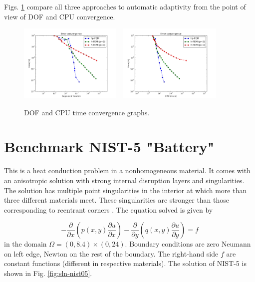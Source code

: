 \documentclass[12pt]{elsarticle}
\begin{document}
Figs. \ref{fig:nist-4-conv} compare all
three approaches to automatic adaptivity from the point
of view of DOF and CPU convergence.

\begin{figure}[H]
\centering
\vspace{-5mm}
\includegraphics[height=3.7cm]{nist/nist-4/conv_dof_aniso.png}\ \
\includegraphics[height=3.7cm]{nist/nist-4/conv_cpu_aniso.png}
\vspace{-5mm}
\caption{DOF and CPU time convergence graphs.}
\vspace{-5mm}
\label{fig:nist-4-conv}
\end{figure}


\section{Benchmark NIST-5 "Battery"}
\label{sec:bench-5}

This is a heat conduction problem in a nonhomogeneous material.
It comes with an anisotropic solution with strong internal disruption
layers and singularities.
The solution has multiple point singularities in the interior at which
more than three different materials meet. These singularities are stronger than those
corresponding to reentrant corners \cite{demkowicz-1}.
The equation solved is given by

\begin{equation} \label{heat-conduction}
-\frac{\partial }{\partial x}\left(p(x, y)\frac{\partial u}{\partial x}\right)
-\frac{\partial }{\partial y}\left(q(x, y)\frac{\partial u}{\partial y}\right) = f
\end{equation}
in the domain $\Omega = (0, 8.4) \times (0, 24)$. Boundary conditions are zero Neumann on left edge, Newton on the rest of the boundary.
The right-hand side $f$ are constant functions (different in respective materials).
The solution of NIST-5 is shown in Fig. \ref{fig:sln-nist05}.
\end{document}
